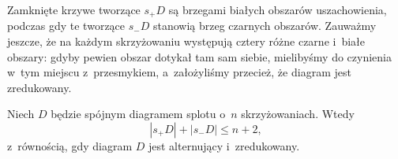 \begin{comment}
\[
    \begin{tikzpicture}[baseline=-0.65ex,scale=0.10]
        \node at (0, 8) {$s_+D$};
        \draw[fill=blue!10!white,draw=none] (-25, -5) rectangle (25, 5);
        \draw[fill=white, draw=none] (-15, -5) [in=left, out=up] to (-12, 0) -- (-8, 0) [in=up, out=right] to (-5, -5);
        \draw[fill=white, draw=none] (5, -5) [in=left, out=up] to (8, 0) -- (12, 0) [in=up, out=right] to (15, -5);
        \draw[fill=white, draw=none] (-5, 5) [in=left, out=down] to (-2, 0) -- (2, 0) [in=down, out=right] to (5, 5);
        \draw[fill=white, draw=none] (-25, 0) -- (-18, 0) [in=down, out=right] to (-15, 5) -- (-25, 5);
        \draw[fill=white, draw=none] ( 25, 0) -- ( 18, 0) [in=down, out=left] to ( 15, 5) -- ( 25, 5);
    \end{tikzpicture}
    \quad
    \begin{tikzpicture}[baseline=-0.65ex,scale=0.10]
        \node at (0, 8) {$s_-D$};
        \draw[fill=blue!10!white, draw=none] (-15, 5) [in=left, out=up] to (-12, 0) -- (-8, 0) [in=up, out=right] to (-5, 5);
        \draw[fill=blue!10!white, draw=none] (5, 5) [in=left, out=up] to (8, 0) -- (12, 0) [in=up, out=right] to (15, 5);
        \draw[fill=blue!10!white, draw=none] (-5, -5) [in=left, out=down] to (-2, 0) -- (2, 0) [in=down, out=right] to (5, -5);
        \draw[fill=blue!10!white, draw=none] (-25, 0) -- (-18, 0) [in=down, out=right] to (-15, -5) -- (-25, -5);
        \draw[fill=blue!10!white, draw=none] ( 25, 0) -- ( 18, 0) [in=down, out=left] to ( 15, -5) -- ( 25, -5);
    \end{tikzpicture}
\]
\end{comment}

Zamknięte krzywe tworzące $s_+D$ są brzegami białych obszarów uszachowienia, podczas gdy te tworzące $s_-D$ stanowią brzeg czarnych obszarów.
Zauważmy jeszcze, że na każdym skrzyżowaniu występują cztery różne czarne i~białe obszary: gdyby pewien obszar dotykał tam sam siebie, mielibyśmy do czynienia w~tym miejscu z~przesmykiem, a~założyliśmy przecież, że diagram jest zredukowany.

\begin{lemma}
    \label{lem:pretait_lemma_1}
    Niech $D$ będzie spójnym diagramem splotu o~$n$ skrzyżowaniach.
    Wtedy
    \begin{equation}
        |s_+D| + |s_-D| \le n+2,
    \end{equation}
    z~równością, gdy diagram $D$ jest alternujący i~zredukowany.
\end{lemma}


